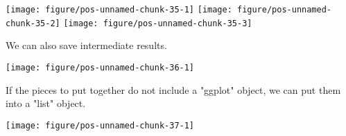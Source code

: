 \documentclass[paper=a4,headsepline,BCOR=12mm,twoside,open=right,%
titlepage,headings=small,fontsize=10pt,index=totoc,bibliography=totoc,%
captions=tableheading,captions=nooneline]{scrbook}\usepackage{knitr}
\begin{document}
\begin{knitrout}\footnotesize
{}\color{fgcolor}\begin{kframe}
\begin{alltt}
 \hlopt{+}  \hlopt{+} \hlstd{(}\hlstd{)}
 \hlopt{+}  \hlopt{+} \hlstd{(}\hlstd{)} \hlopt{+} \hlstd{(}\hlstd{,} \hlstd{)}
\end{alltt}
\end{kframe}

{\centering \texttt{[image: figure/pos-unnamed-chunk-35-1]} 
\texttt{[image: figure/pos-unnamed-chunk-35-2]} 
\texttt{[image: figure/pos-unnamed-chunk-35-3]} 

}



\end{knitrout}

We can also save intermediate results.

\begin{knitrout}\footnotesize
{}\color{fgcolor}\begin{kframe}
\begin{alltt}
 \hlkwb{<-}  \hlopt{+} \hlstd{(}\hlstd{=}\hlstd{(}\hlstd{,}\hlstd{))}
 \hlopt{+}  \hlopt{+} \hlstd{(}\hlstd{)}
\end{alltt}
\end{kframe}

{\centering \texttt{[image: figure/pos-unnamed-chunk-36-1]} 

}



\end{knitrout}

If the pieces to put together do not include a "ggplot" object, we can put them
into a "list" object.

\begin{knitrout}\footnotesize
{}\color{fgcolor}\begin{kframe}
\begin{alltt}
 \hlkwb{<-}  \hlstd{(}\hlstd{))}
 \hlopt{+} 
\end{alltt}
\end{kframe}

{\centering \texttt{[image: figure/pos-unnamed-chunk-37-1]} 

}



\end{knitrout}
\end{document}
